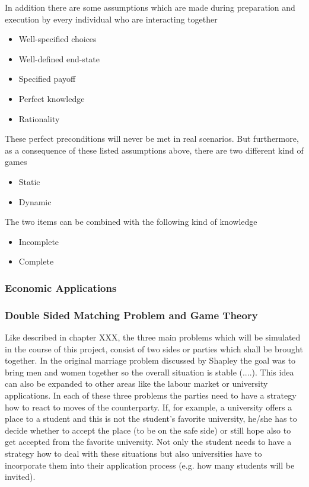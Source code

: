 In addition there are some assumptions which are made during preparation and execution by every individual who are interacting together \cite {gibbons1997gametheory}
\begin{itemize}
	\item Well-specified choices
	\item Well-defined end-state
	\item Specified payoff
	\item Perfect knowledge
	\item Rationality 
\end{itemize}

These perfect preconditions will never be met in real scenarios. But furthermore, as a consequence of these listed assumptions above, there are two different kind of games

\begin{itemize}
	\item Static
	\item Dynamic
\end{itemize}

The two items can be combined with the following kind of knowledge

\begin{itemize}
	\item Incomplete
	\item Complete
\end{itemize}


\subsubsection{Economic Applications}

\subsubsection{Double Sided Matching Problem and Game Theory}

Like described in chapter XXX, the three main problems which will be simulated in the course of this project, consist of two sides or parties which shall be brought together. In the original marriage problem discussed by Shapley the goal was to bring men and women together so the overall situation is stable (....). This idea can also be expanded to other areas like the labour market or university applications. In each of these three problems the parties need to have a strategy how to react to moves of the counterparty. If, for example, a university offers a place to a student and this is not the student's favorite university,  he/she has to decide whether to accept the place (to be on the safe side) or still hope also to get accepted from the favorite university. Not only the student needs to have a strategy how to deal with these situations but also universities have to incorporate them into their application process (e.g. how many students will be invited).